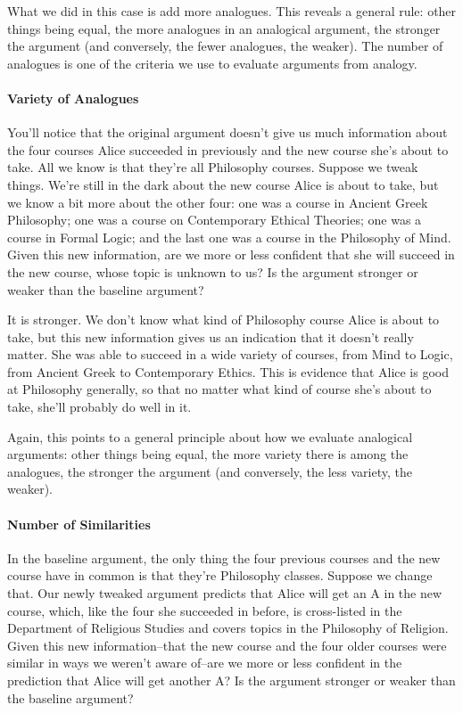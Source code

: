 What we did in this case is add more analogues. This reveals a general rule: other things being
equal, the more analogues in an analogical argument, the stronger the argument (and conversely,
the fewer analogues, the weaker). The number of analogues is one of the criteria we use to evaluate
arguments from analogy.

\paragraph{Variety of Analogues}

You'll notice that the original argument doesn't give us much information about the four courses
Alice succeeded in previously and the new course she's about to take. All we know is that they're
all Philosophy courses. Suppose we tweak things. We're still in the dark about the new course
Alice is about to take, but we know a bit more about the other four: one was a course in Ancient
Greek Philosophy; one was a course on Contemporary Ethical Theories; one was a course in
Formal Logic; and the last one was a course in the Philosophy of Mind. Given this new
information, are we more or less confident that she will succeed in the new course, whose topic is
unknown to us? Is the argument stronger or weaker than the baseline argument?

It is stronger. We don't know what kind of Philosophy course Alice is about to take, but this new
information gives us an indication that it doesn't really matter. She was able to succeed in a wide
variety of courses, from Mind to Logic, from Ancient Greek to Contemporary Ethics. This is
evidence that Alice is good at Philosophy generally, so that no matter what kind of course she's
about to take, she'll probably do well in it.

Again, this points to a general principle about how we evaluate analogical arguments: other things
being equal, the more variety there is among the analogues, the stronger the argument (and
conversely, the less variety, the weaker).

\paragraph{Number of Similarities}

In the baseline argument, the only thing the four previous courses and the new course have in
common is that they're Philosophy classes. Suppose we change that. Our newly tweaked argument
predicts that Alice will get an A in the new course, which, like the four she succeeded in before,
is cross-listed in the Department of Religious Studies and covers topics in the Philosophy of
Religion. Given this new information--that the new course and the four older courses were similar
in ways we weren't aware of--are we more or less confident in the prediction that Alice will get
another A? Is the argument stronger or weaker than the baseline argument?

